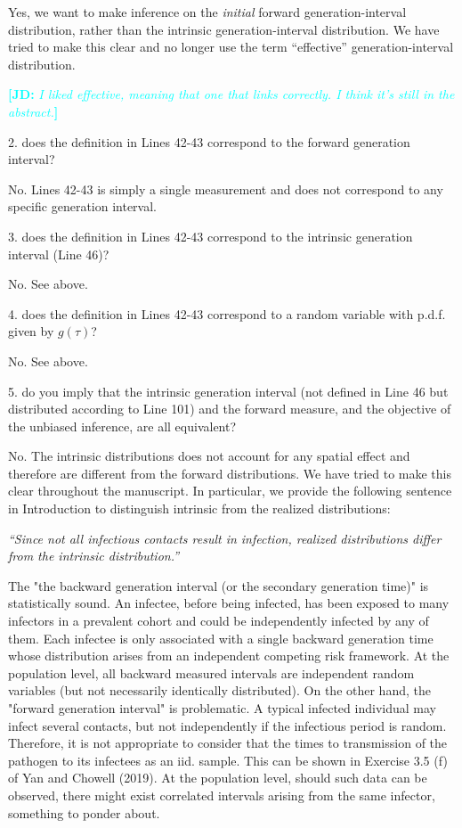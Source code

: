 \documentclass[12pt]{article}
\newcommand{\revtext}{\textsf}
\newcommand{\newtext}[1]{\textsl{``#1''}}
\newcommand{\comment}[3]{\textcolor{#1}{\textbf{[#2: }\textsl{#3}\textbf{]}}}
\newcommand{\jd}[1]{\comment{cyan}{JD}{#1}}
\begin{document}
Yes, we want to make inference on the \emph{initial} forward generation-interval distribution, rather than the intrinsic generation-interval distribution.
We have tried to make this clear and no longer use the term ``effective'' generation-interval distribution.

\jd{I liked effective, meaning that one that links correctly. I think it's still in the abstract.}

\revtext{2. does the definition in Lines 42-43 correspond to the forward generation
interval?}

No. Lines 42-43 is simply a single measurement and does not correspond to any specific generation interval.

\revtext{3. does the definition in Lines 42-43 correspond to the intrinsic generation
interval (Line 46)?}

No. See above.

\revtext{4. does the definition in Lines 42-43 correspond to a random variable with
p.d.f. given by $g(\tau)$?}

No. See above.

\revtext{5. do you imply that the intrinsic generation interval (not defined in Line 46
but distributed according to Line 101) and the forward measure, and the
objective of the unbiased inference, are all equivalent?}

No. The intrinsic distributions does not account for any spatial effect and therefore are different from the forward distributions.
We have tried to make this clear throughout the manuscript.
In particular, we provide the following sentence in Introduction to distinguish intrinsic from the realized distributions:

\newtext{Since not all infectious contacts result in infection, realized distributions differ from the intrinsic distribution.}

\revtext{
The "the backward generation interval (or the secondary generation time)" is statistically sound. An infectee, before being infected, has been exposed to many infectors in a prevalent cohort and
could be independently infected by any of them. Each infectee is only associated with a single backward generation time whose distribution arises
from an independent competing risk framework. At the population level,
all backward measured intervals are independent random variables (but
not necessarily identically distributed). On the other hand, the "forward
generation interval" is problematic. A typical infected individual may
infect several contacts, but not independently if the infectious period is
random. Therefore, it is not appropriate to consider that the times to
transmission of the pathogen to its infectees as an iid. sample. This can
be shown in Exercise 3.5 (f) of Yan and Chowell (2019). At the population level, should such data can be observed, there might exist correlated
intervals arising from the same infector, something to ponder about.
}
\end{document}
